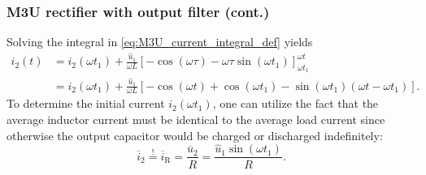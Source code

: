 \begin{frame}
    \frametitle{M3U rectifier with output filter (cont.)}
    Solving the integral in \eqref{eq:M3U_current_integral_def} yields
    \begin{equation}
        \begin{split}
            i_2(t) &= i_2(\omega t_1) + \frac{\hat{u}_1}{\omega L} \left[-\cos(\omega \tau) -\omega\tau\sin(\omega t_1) \right]_{\omega t_1}^{\omega t} \\ &= i_2(\omega t_1) + \frac{\hat{u}_1}{\omega L} \left[-\cos(\omega t) + \cos(\omega t_1) -\sin(\omega t_1)\left(\omega t - \omega t_1\right)\right].
        \end{split}
         \label{eq:M3U_current_integral}
    \end{equation}
    \pause
    To determine the initial current $i_2(\omega t_1)$, one can utilize the fact that the average inductor current must be identical to the average load current since otherwise the output capacitor would be charged or discharged indefinitely:
    \begin{equation}
        \overline{i}_2 \stackrel{!}{=} \overline{i}_\mathrm{R} = \frac{\overline{u}_2}{R} = \frac{\hat{u}_1\sin(\omega t_1)}{R}. 
        \label{eq:M3U_current_average}
    \end{equation}
\end{frame}

